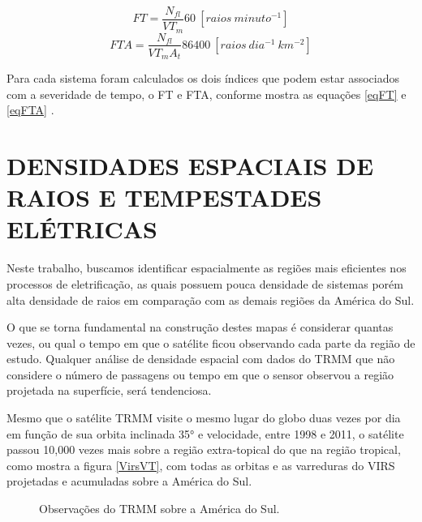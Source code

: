 \begin{equation}
FT = \frac{N_{fl} }{VT_m} 60 ~[raios~minuto^{-1}]  
\label{eqFT}  
\end{equation}
\begin{equation}
FTA = \frac{N_{fl} }{VT_m A_t } 86400 ~[raios~dia^{-1}~km^{-2}]
\label{eqFTA}
\end{equation}

Para cada sistema foram calculados os dois índices que podem estar associados com a severidade de tempo, o FT e FTA, conforme mostra as equações \ref{eqFT} e \ref{eqFTA} 
 .

\section{DENSIDADES ESPACIAIS DE RAIOS E TEMPESTADES ELÉTRICAS}

Neste trabalho, buscamos identificar espacialmente as regiões mais eficientes nos processos de eletrificação, as quais possuem pouca densidade de sistemas porém alta densidade de raios em comparação com as demais regiões da América do Sul.

O que se torna fundamental na construção destes mapas é considerar quantas vezes, ou qual o tempo em que o satélite ficou observando cada parte da região de estudo. Qualquer análise de densidade espacial com dados do TRMM que não considere o número de passagens ou tempo em que o sensor observou a região projetada na superfície, será tendenciosa.

Mesmo que o satélite TRMM visite o mesmo lugar do globo duas vezes por dia em função de sua orbita inclinada 35° e velocidade, entre 1998 e 2011, o satélite passou 10,000 vezes mais sobre a região extra-topical do que na região tropical, como mostra a figura \ref{VirsVT}, com todas as orbitas e as varreduras do VIRS projetadas e acumuladas sobre a América do Sul. 

\begin{figure}[!Hb]

\caption{Observações do TRMM sobre a América do Sul.}
\label{gridVT} 
\end{figure} 

